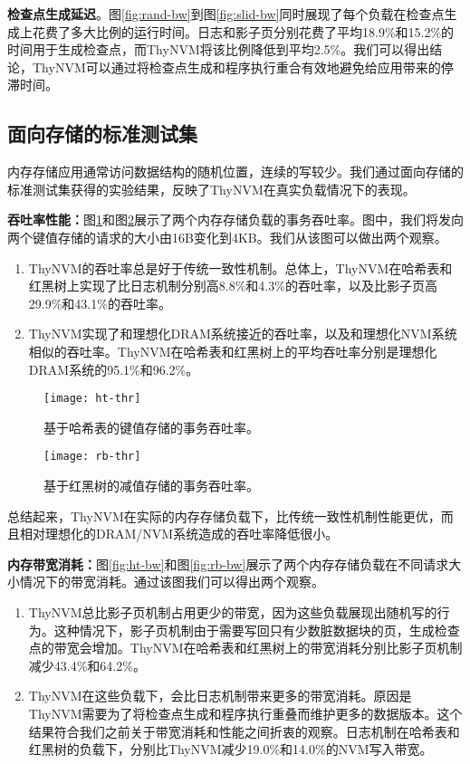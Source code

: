 \textbf{检查点生成延迟}。图\ref{fig:rand-bw}到图\ref{fig:slid-bw}同时展现了每个负载在检查点生成上花费了多大比例的运行时间。日志和影子页分别花费了平均18.9\%和15.2\%的时间用于生成检查点，而ThyNVM将该比例降低到平均2.5\%。我们可以得出结论，ThyNVM可以通过将检查点生成和程序执行重合有效地避免给应用带来的停滞时间。 

\subsection{面向存储的标准测试集}

内存存储应用通常访问数据结构的随机位置，连续的写较少。我们通过面向存储的标准测试集获得的实验结果，反映了ThyNVM在真实负载情况下的表现。

\textbf{吞吐率性能：}图\ref{fig:ht-thr}和图\ref{fig:rb-thr}展示了两个内存存储负载的事务吞吐率。图中，我们将发向两个键值存储的请求的大小由16B变化到4KB。我们从该图可以做出两个观察。
\begin{enumerate}
\item ThyNVM的吞吐率总是好于传统一致性机制。总体上，ThyNVM在哈希表和红黑树上实现了比日志机制分别高8.8\%和4.3\%的吞吐率，以及比影子页高29.9\%和43.1\%的吞吐率。
\item ThyNVM实现了和理想化DRAM系统接近的吞吐率，以及和理想化NVM系统相似的吞吐率。ThyNVM在哈希表和红黑树上的平均吞吐率分别是理想化DRAM系统的95.1\%和96.2\%。
\end{enumerate}

\begin{figure}[!h]
  \centering
  \texttt{[image: ht-thr]}\\
  \caption{基于哈希表的键值存储的事务吞吐率。}
  \label{fig:ht-thr}
\end{figure}

\begin{figure}[!h]
  \centering
  \texttt{[image: rb-thr]}\\
  \caption{基于红黑树的减值存储的事务吞吐率。}
  \label{fig:rb-thr}
\end{figure}

总结起来，ThyNVM在实际的内存存储负载下，比传统一致性机制性能更优，而且相对理想化的DRAM/NVM系统造成的吞吐率降低很小。 

\textbf{内存带宽消耗：}图\ref{fig:ht-bw}和图\ref{fig:rb-bw}展示了两个内存存储负载在不同请求大小情况下的带宽消耗。通过该图我们可以得出两个观察。
\begin{enumerate}
\item ThyNVM总比影子页机制占用更少的带宽，因为这些负载展现出随机写的行为。这种情况下，影子页机制由于需要写回只有少数脏数据块的页，生成检查点的带宽会增加。ThyNVM在哈希表和红黑树上的带宽消耗分别比影子页机制减少43.4\%和64.2\%。
\item ThyNVM在这些负载下，会比日志机制带来更多的带宽消耗。原因是ThyNVM需要为了将检查点生成和程序执行重叠而维护更多的数据版本。这个结果符合我们之前关于带宽消耗和性能之间折衷的观察。日志机制在哈希表和红黑树的负载下，分别比ThyNVM减少19.0\%和14.0\%的NVM写入带宽。
\end{enumerate}

